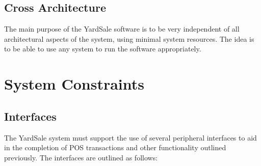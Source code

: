 \documentclass{report}
\begin{document}
    \subsection{Cross Architecture}
    The main purpose of the YardSale software is to be very
    independent of all architectural aspects of the system, using
    minimal system resources.  The idea is to be able to use any system
    to run the software appropriately.

\section{System Constraints}
    \subsection{Interfaces}
    The YardSale system must support the use of several peripheral interfaces
    to aid in the completion of POS transactions and other functionality outlined
    previously.  The interfaces are outlined as follows:
\end{document}
